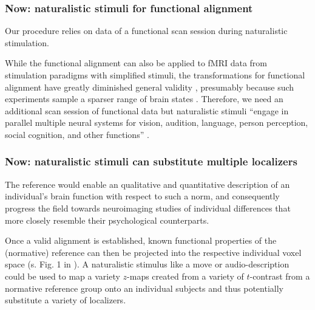 \subsubsection{Now: naturalistic stimuli for functional alignment}
%
Our procedure relies on data of a functional scan session during naturalistic
stimulation.

%
While the functional alignment can also be applied to fMRI data from stimulation
paradigms with simplified stimuli, the transformations for functional alignment
have greatly diminished general validity \citep{haxby2011common}, presumably
because such experiments sample a sparser range of brain states
\citep{guntupalli2016model}.
%
Therefore, we need an additional scan session of functional data but
naturalistic stimuli ``engage in parallel multiple neural systems for vision,
audition, language, person perception, social cognition, and other functions''
\citep{jiahui2020predicting}.


\subsubsection{Now: naturalistic stimuli can substitute multiple localizers}
%
The reference would enable an qualitative and quantitative description of an
individual's brain function with respect to such a norm, and consequently
progress the field towards neuroimaging studies of individual differences that
more closely resemble their psychological counterparts.

%
Once a valid alignment is established, known functional properties of the
(normative) reference can then be projected into the respective individual voxel
space (s. Fig. 1 in \citep{nishimoto2016lining}).
%
A naturalistic stimulus like a move or audio-description could be used to map a
variety $z$-maps created from a variety of $t$-contrast from a normative
reference group onto an individual subjects and thus potentially substitute a
variety of localizers.


